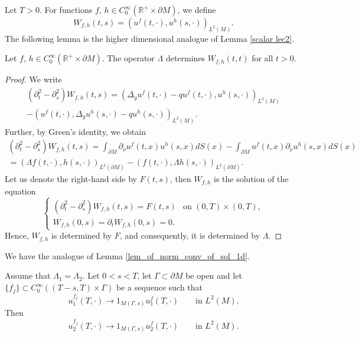 \documentclass[12pt,oneside,final]{amsart}
\def\R{\mathbb R}
\begin{document}
Let $T>0$. For functions $f$, $h\in C_0^\infty(\R^+ \times \partial M)$, we define
\begin{equation*}
	W_{f,h}(t,s) = (u^f(t,\cdot), u^h(s,\cdot))_{L^2(M)}.
\end{equation*}
The following lemma is the higher dimensional analogue of Lemma \ref{scalar lec2}.
\begin{lemma}\label{scalr_prod_nd}
	Let $f$, $h\in C_0^\infty(\R^+ \times \partial M)$. The operator $\Lambda$ determines $W_{f,h}(t,t)$ for all $t > 0$.
\end{lemma}
\begin{proof}
	We write
	\begin{multline*}
		(\partial_t^2 - \partial_s^2) W_{f,h}(t,s) = \left( \Delta_g u^{f}(t,\cdot) - q u^f(t,\cdot), u^{h}(s,\cdot) \right)_{L^2(M)}\\
		- \left( u^{f}(t,\cdot), \Delta_g u^{h}(s,\cdot) - q u^h(s,\cdot) \right)_{L^2(M)}.
	\end{multline*}
	Further, by Green's identity, we obtain
	\begin{multline*}
		(\partial_t^2 - \partial_s^2) W_{f,h}(t,s)  = \int_{\partial M} \partial_\nu u^f(t,x) u^h(s,x) dS(x) - \int_{\partial M}  u^f(t,x) \partial_\nu u^h(s,x) dS(x)\\
		= \left( \Lambda f(t,\cdot), h(s,\cdot)\right)_{L^2(\partial M)} - \left( f(t,\cdot),  \Lambda h(s,\cdot)\right)_{L^2(\partial M)}.
	\end{multline*}
	Let us denote the right-hand side by $F(t,s)$, then $W_{f,h}$ is the solution of the equation
	\begin{equation*}
		\begin{cases}
			(\partial_t^2 - \partial_s^2) W_{f,h}(t,s) = F(t,s) & \text{on } (0,T)\times (0, T),\\
			W_{f,h}(0,s) = \partial_tW_{f,h}(0,s) = 0.
		\end{cases}
	\end{equation*}
	Hence, $W_{f,h}$ is determined by $F$, and consequently, it is determined by $\Lambda$. 
\end{proof}


We have the analogue of Lemma \ref{lem_of_norm_conv_of_sol_1d}.

\begin{lemma}\label{eq_of_norm_conv_of_sol}
Assume that $\Lambda_1 = \Lambda_2$.
	Let $0<s<T$, let $\Gamma \subset \partial M$ be open and let $\{f_j\} \subset C_0^\infty((T-s, T)\times \Gamma)$ be a sequence such that
	\begin{equation*}
		u_1^{f_j}(T,\cdot) \rightarrow 1_{M(\Gamma,s)}u_1^f(T,\cdot) \qquad \text{in } L^2(M).
	\end{equation*}
	Then
	\begin{equation*}
		u_2^{f_j}(T,\cdot) \rightarrow 1_{M(\Gamma,s)}u_2^f(T,\cdot) \qquad \text{in } L^2(M).
	\end{equation*}
\end{lemma}
\end{document}
